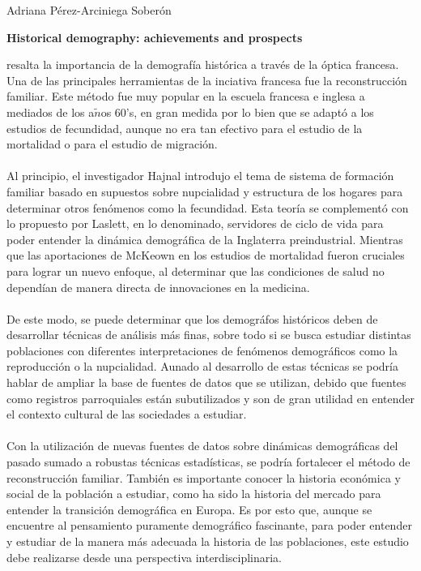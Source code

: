 \documentclass[11pt,spanish,letterpaper]{article}
\theoremstyle{plain}
\begin{document}
\begin{flushleft}
Adriana P\'erez-Arciniega Sober\'on
\end{flushleft}
\begin{center}
\textbf{Historical demography: achievements and prospects}
\end{center}
\cite{saito1996historical} resalta la importancia de la demograf\'ia hist\'orica a trav\'es de la \'optica francesa. Una de las principales herramientas de la inciativa francesa fue la reconstrucci\'on familiar. Este m\'etodo fue muy popular en la escuela francesa e inglesa a mediados de los a$\tilde{n}$os 60's, en gran medida por lo bien que se adapt\'o a los estudios de fecundidad, aunque no era tan efectivo para el estudio de la mortalidad o para el estudio de migraci\'on.\\
\\
Al principio, el investigador Hajnal introdujo el tema de sistema de formaci\'on familiar basado en supuestos sobre nupcialidad y estructura de los hogares para determinar otros fen\'omenos como la fecundidad. Esta teor\'ia se complement\'o con lo propuesto por Laslett, en lo denominado, servidores de ciclo de vida para poder entender la din\'amica demogr\'afica de la Inglaterra preindustrial. Mientras que las aportaciones de McKeown en los estudios de mortalidad fueron cruciales para lograr un nuevo enfoque, al determinar que las condiciones de salud no depend\'ian de manera directa de innovaciones en la medicina.\\
\\
De este modo, se puede determinar que los demogr\'afos hist\'oricos deben de desarrollar t\'ecnicas de an\'alisis m\'as finas, sobre todo si se busca estudiar distintas poblaciones con diferentes interpretaciones de fen\'omenos demogr\'aficos como la reproducci\'on o la nupcialidad. Aunado al desarrollo de estas t\'ecnicas se podr\'ia hablar de ampliar la base de fuentes de datos que se utilizan, debido que fuentes como registros parroquiales est\'an subutilizados y son de gran utilidad en entender el contexto cultural de las sociedades a estudiar.\\
\\
Con la utilizaci\'on de nuevas fuentes de datos sobre din\'amicas demogr\'aficas del pasado sumado a robustas t\'ecnicas estad\'isticas, se podr\'ia fortalecer el m\'etodo de reconstrucci\'on familiar. Tambi\'en es importante conocer la historia econ\'omica y social de la poblaci\'on a estudiar, como ha sido la historia del mercado para entender la transici\'on demogr\'afica en Europa. Es por esto que, aunque se encuentre al pensamiento puramente demogr\'afico fascinante, para poder entender y estudiar de la manera m\'as adecuada la historia de las poblaciones, este estudio debe realizarse desde una perspectiva interdisciplinaria.


\end{document}
